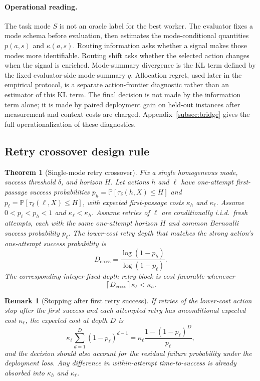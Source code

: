 \documentclass{article}
\newtheorem{theorem}{Theorem}
\newtheorem{remark}{Remark}
\newcommand{\Prb}{\mathbb{P}}
\newcommand{\Dcross}{D_{\mathrm{cross}}}
\begin{document}
\paragraph{Operational reading.}
The task mode $S$ is not an oracle label for the best worker.
The evaluator fixes a mode schema before evaluation, then estimates the mode-conditional quantities $p(a,s)$ and $\kappa(a,s)$.
Routing information asks whether a signal makes those modes more identifiable.
Routing shift asks whether the selected action changes when the signal is enriched.
Mode-summary divergence is the KL term defined by the fixed evaluator-side mode summary $q$.
Allocation regret, used later in the empirical protocol, is a separate action-frontier diagnostic rather than an estimator of this KL term.
The final decision is not made by the information term alone; it is made by paired deployment gain on held-out instances after measurement and context costs are charged.
Appendix~\ref{subsec:bridge} gives the full operationalization of these diagnostics.

\subsection{Retry crossover design rule}
\label{sec:crossover}

\begin{theorem}[Single-mode retry crossover]
\label{thm:crossover}
Fix a single homogeneous mode, success threshold $\delta$, and horizon $H$.
Let actions $h$ and $\ell$ have one-attempt first-passage success probabilities
$p_h=\Prb[\tau_\delta(h,X)\le H]$ and $p_\ell=\Prb[\tau_\delta(\ell,X)\le H]$,
with expected first-passage costs $\kappa_h$ and $\kappa_\ell$.
Assume $0<p_\ell<p_h<1$ and $\kappa_\ell<\kappa_h$.
Assume retries of $\ell$ are conditionally i.i.d.\ fresh attempts, each with the same one-attempt horizon $H$ and common Bernoulli success probability $p_\ell$.
The lower-cost retry depth that matches the strong action's one-attempt success probability is
\[
\Dcross=\frac{\log(1-p_h)}{\log(1-p_\ell)}.
\]
The corresponding integer fixed-depth retry block is cost-favorable whenever
\[
\left\lceil \Dcross \right\rceil \kappa_\ell < \kappa_h .
\]
\end{theorem}

\begin{remark}[Stopping after first retry success]
If retries of the lower-cost action stop after the first success and each attempted retry has unconditional expected cost $\kappa_\ell$, the expected cost at depth $D$ is
\[
\kappa_\ell\sum_{d=1}^{D}(1-p_\ell)^{d-1}
=
\kappa_\ell\frac{1-(1-p_\ell)^D}{p_\ell},
\]
and the decision should also account for the residual failure probability under the deployment loss.
Any difference in within-attempt time-to-success is already absorbed into $\kappa_h$ and $\kappa_\ell$.
\end{remark}
\end{document}

